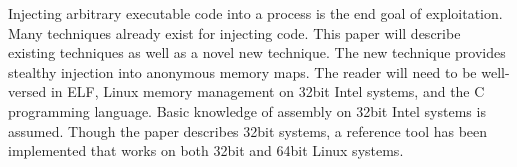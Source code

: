 Injecting arbitrary executable code into a process is the end goal of exploitation.
Many techniques already exist for injecting code. This paper will describe existing
techniques as well as a novel new technique. The new technique provides stealthy
injection into anonymous memory maps. The reader will need to be well-versed in ELF,
Linux memory management on 32bit Intel systems, and the C programming language.
Basic knowledge of assembly on 32bit Intel systems is assumed. Though the paper
describes 32bit systems, a reference tool has been implemented that works on
both 32bit and 64bit Linux systems.
